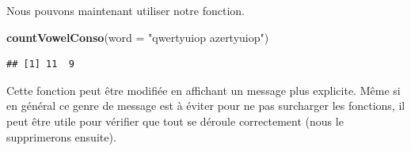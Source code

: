\documentclass[]{book}
\newenvironment{Shaded}{\begin{snugshade}}{\end{snugshade}}
\newcommand{\ControlFlowTok}[1]{\textcolor[rgb]{0.13,0.29,0.53}{\textbf{#1}}}
\newcommand{\DataTypeTok}[1]{\textcolor[rgb]{0.13,0.29,0.53}{#1}}
\newcommand{\DecValTok}[1]{\textcolor[rgb]{0.00,0.00,0.81}{#1}}
\newcommand{\KeywordTok}[1]{\textcolor[rgb]{0.13,0.29,0.53}{\textbf{#1}}}
\newcommand{\NormalTok}[1]{#1}
\newcommand{\OperatorTok}[1]{\textcolor[rgb]{0.81,0.36,0.00}{\textbf{#1}}}
\newcommand{\StringTok}[1]{\textcolor[rgb]{0.31,0.60,0.02}{#1}}
\begin{document}
\begin{Shaded}
\end{Shaded}

Nous pouvons maintenant utiliser notre fonction.

\begin{Shaded}
\begin{Highlighting}[]
\KeywordTok{countVowelConso}\NormalTok{(}\DataTypeTok{word =} \StringTok{"qwertyuiop azertyuiop"}\NormalTok{)}
\end{Highlighting}
\end{Shaded}

\begin{verbatim}
## [1] 11  9
\end{verbatim}

Cette fonction peut être modifiée en affichant un message plus explicite. Même si en général ce genre de message est à éviter pour ne pas surcharger les fonctions, il peut être utile pour vérifier que tout se déroule correctement (nous le supprimerons ensuite).
\end{document}
